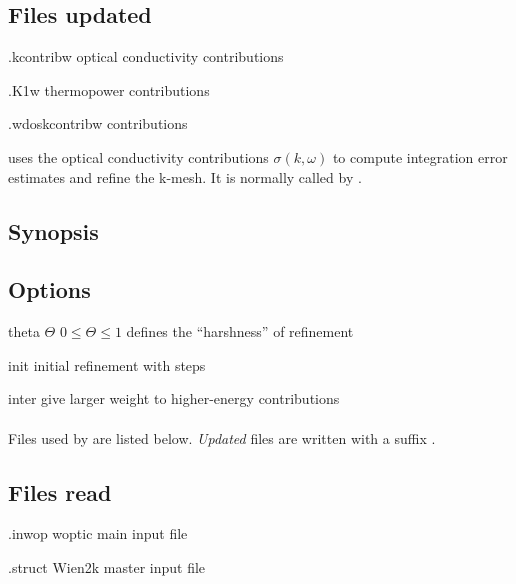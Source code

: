 \subsection{Files updated}
\begin{options}
\item[\case.kcontribw] optical conductivity contributions
\item[\case.K1w] thermopower contributions
\item[\case.wdoskcontribw] \dos contributions
\end{options}



 uses the optical conductivity contributions $σ(k, ω)$ to
compute integration error estimates and refine the k-mesh.  It is
normally called by \woprog.

\subsection{Synopsis}
\begin{usage}
   \case
\end{usage}

\subsection{Options}
\begin{options}
\item[\td theta $Θ$] $0 \le Θ \le 1$ defines the ``harshness'' of
  refinement 
\item[\td init \NI] initial refinement with \NI steps 
\item[\td inter] give larger weight to higher-energy contributions
\end{options}

\paragraph{} Files used by  are listed below.  \emph{Updated}
files are written with a suffix .

\subsection{Files read}
\begin{options}
\item[\case.inwop] woptic main input file
\item[\case.struct] Wien2k master input file
\end{options}


